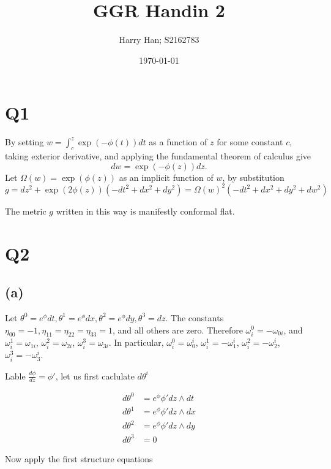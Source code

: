 \documentclass{article}
\title{GGR Handin 2}
\author{Harry Han; S2162783}
\date{\today}
\theoremstyle{definition}
\theoremstyle{definition}
\theoremstyle{remark}
\begin{document}
\maketitle

\section*{Q1}
By setting $w =  \int_{c}^z \exp(-\phi(t))dt $ as a function of $z$	for some constant $c$, taking exterior derivative, and applying the fundamental theorem of calculus give
$$
	dw = \exp(-\phi(z))dz.
$$
Let $\Omega(w) = \exp(\phi(z))$ as an implicit function of $w$, by substitution 
\begin{equation}\label{eq:1}
	g = dz^2 + \exp(2\phi(z)) (-dt^2 + dx^2 + dy^2) = \Omega(w)^2(-dt^2 + dx^2 + dy^2 + dw^2)
\end{equation}

The metric $g$ written in this way is manifestly conformal flat.

\section*{Q2}

\subsection*{(a)}

Let $\theta^0 = e^{\phi}dt, \theta^1 = e^{\phi} dx, \theta^2 = e^{\phi} dy, \theta^3 = dz$. 
The constants $\eta_{00} = - 1, \eta_{11} = \eta_{22} = \eta_{33} = 1$, and all others are zero.
Therefore $\omega_i^0 = -\omega_{0i}$, and $\omega^1_i = \omega_{1i}$, $\omega^2_i = \omega_{2i}$, $\omega^3_i = \omega_{3i}$.
In particular, $\omega^0_{i} = \omega^i_0$, $\omega^1_i = - \omega^i_1$, $\omega^2_i = - \omega^i_2$, $\omega^3_i = - \omega^i_3$.

Lable $\frac{d \phi}{dz} = \phi'$, let us first caclulate $d \theta^i$

\begin{align*}
	d\theta^0 &= e^{\phi} \phi' dz \wedge dt \\
	d\theta^1 &= e^{\phi} \phi' dz \wedge dx \\
	d\theta^2 &= e^{\phi} \phi' dz \wedge dy \\
	d\theta^3 &= 0
\end{align*}

Now apply the first structure equations
\end{document}
